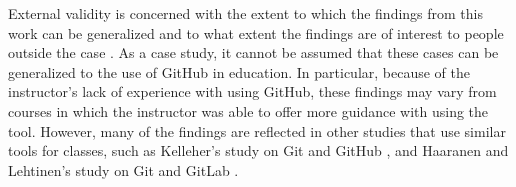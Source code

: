 External validity is concerned with the extent to which the findings from this work can be generalized and to what extent the findings are of interest to people outside the case \cite{runeson2012case}. As a case study, it cannot be assumed that these cases can be generalized to the use of GitHub in education. In particular, because of the instructor's lack of experience with using GitHub, these findings may vary from courses in which the instructor was able to offer more guidance with using the tool. However, many of the findings are reflected in other studies that use similar tools for classes, such as Kelleher's study on Git and GitHub \cite{kelleher2014employing}, and Haaranen and Lehtinen's study on Git and GitLab \cite{haaranen2015teaching}.




